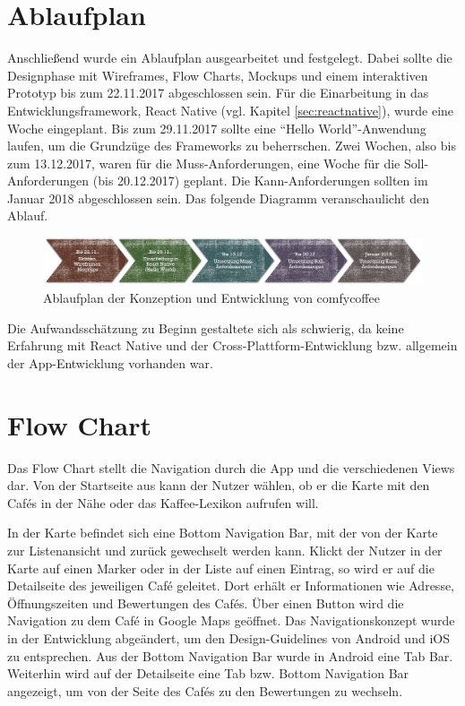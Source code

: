 \section{Ablaufplan}
\label{sec:ablaufplan}
Anschließend wurde ein Ablaufplan ausgearbeitet und festgelegt. Dabei sollte die Designphase mit Wireframes, Flow Charts, Mockups und einem interaktiven Prototyp bis zum 22.11.2017 abgeschlossen sein. Für die Einarbeitung in das Entwicklungsframework, React Native (vgl. Kapitel \ref{sec:reactnative}), wurde eine Woche eingeplant. Bis zum 29.11.2017 sollte eine ``Hello World''-Anwendung laufen, um die Grundzüge des Frameworks zu beherrschen. Zwei Wochen, also bis zum 13.12.2017, waren für die Muss-Anforderungen, eine Woche für die Soll-Anforderungen (bis 20.12.2017) geplant. Die Kann-Anforderungen sollten im Januar 2018 abgeschlossen sein. Das folgende Diagramm veranschaulicht den Ablauf.

\begin{figure}[H]
    \centering
		\includegraphics[width=\textwidth]{Bilder/ablaufplan.png}
		\caption{Ablaufplan der Konzeption und Entwicklung von comfycoffee}
\end{figure}

Die Aufwandsschätzung zu Beginn gestaltete sich als schwierig, da keine Erfahrung mit React Native und der Cross-Plattform-Entwicklung bzw. allgemein der App-Entwicklung vorhanden war.

\section{Flow Chart}
Das Flow Chart stellt die Navigation durch die App und die verschiedenen Views dar. Von der Startseite aus kann der Nutzer wählen, ob er die Karte mit den Cafés in der Nähe oder das Kaffee-Lexikon aufrufen will. 

In der Karte befindet sich eine Bottom Navigation Bar, mit der von der Karte zur Listenansicht und zurück gewechselt werden kann. Klickt der Nutzer in der Karte auf einen Marker oder in der Liste auf einen Eintrag, so wird er auf die Detailseite des jeweiligen Café geleitet. Dort erhält er Informationen wie Adresse, Öffnungszeiten und Bewertungen des Cafés. Über einen Button wird die Navigation zu dem Café in Google Maps geöffnet. Das Navigationskonzept wurde in der Entwicklung abgeändert, um den Design-Guidelines von Android und iOS zu entsprechen. Aus der Bottom Navigation Bar wurde in Android eine Tab Bar. Weiterhin wird auf der Detailseite eine Tab bzw. Bottom Navigation Bar angezeigt, um von der Seite des Cafés zu den Bewertungen zu wechseln.

